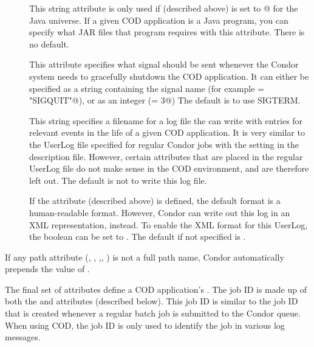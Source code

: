 \begin{description}
 \item[] This string attribute is only used if
    (described above) is set to @ for the
   Java universe.
   If a given COD application is a Java program, you can specify what
   JAR files that program requires with this attribute.
   There is no default.

 \item[] This attribute specifies what signal should be
   sent whenever the Condor system needs to gracefully shutdown the
   COD application.
   It can either be specified as a string containing the signal name
   (for example \verb@KillSig = "SIGQUIT"@), or as an integer
   (\verb@KillSig = 3@)
   The default is to use SIGTERM.

 \item[] This string specifies a filename for a
   log file the  can write with entries for relevant 
   events in the life of a given COD application.
   It is very similar to the UserLog file specified for regular Condor
   jobs with the  setting in the  description
   file.
   However, certain attributes that are placed in the regular UserLog
   file do not make sense in the COD environment, and are therefore
   left out.
   The default is not to write this log file.

 \item[] If the 
   attribute (described above) is defined, the default format is a
   human-readable format.
   However, Condor can write out this log in an XML representation,
   instead.
   To enable the XML format for this UserLog, the
    boolean can be set to \verb@TRUE@.
   The default if not specified is \verb@FALSE@.

\end{description}

\Note If any path attribute (, ,
,, ) is not a full path name,
Condor automatically prepends the value of .



The final set of attributes define a COD application's .
The job ID is made up of both the  and 
attributes (described below).
This job ID is similar to the job ID that is created whenever a
regular batch job is submitted to the Condor queue.
When using COD, the job ID is only used to identify the job in various
log messages.

